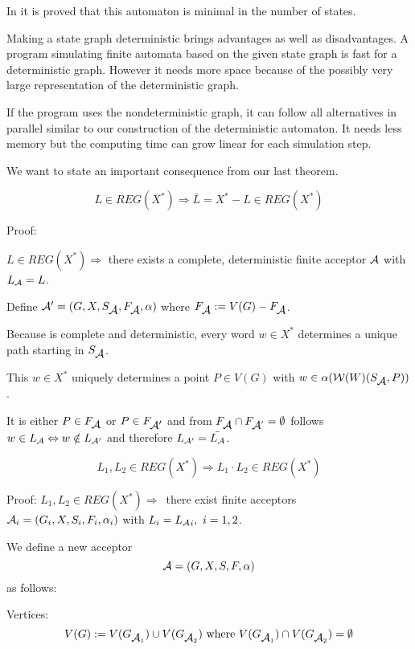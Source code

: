 In \cite{Co} it is proved that this automaton is minimal in the number of
states.

Making a state graph deterministic brings advantages as well as disadvantages. A
program simulating finite automata based on the given state graph is fast for
a deterministic graph. However it needs more space because of the possibly very
large representation of the deterministic graph.

If the program uses the nondeterministic graph, it can follow all alternatives
in parallel similar to our construction of the deterministic automaton. It needs
less memory but the computing time can grow linear for each simulation step.

We want to state an important consequence from our last theorem.

\begin{theorem}
\[ L \in REG(X^*) \Rightarrow \bar{L} = X^* - L \in REG(X^*) \]
\end{theorem}

Proof: 

$L \in REG(X^*) \Rightarrow $ there exists a complete, deterministic
finite acceptor $\mbox{$\mathcal{A}$}$ with $\mbox{$L_{\mathcal{A}}$} = L$.

Define $\mbox{$\mathcal{A'}$} = (G, X, S_{\mbox{$\mathcal{A}$}}, F_{\mbox{$\mathcal{A}$}}, \alpha)$ where $F_{\mbox{$\mathcal{A}$}} :=
V(G) - F_{\mbox{$\mathcal{A}$}}$.

Because  is complete and deterministic, every word $w \in X^*$ determines
a unique path starting in $S_{\mbox{$\mathcal{A}$}}$.

This $w \in X^*$ uniquely determines a point $P \in V(G)$ with $w \in
\alpha(\mbox{$\mathcal{W}(W)$}(S_{\mbox{$\mathcal{A}$}}, P))$.

It is either $P \in F_{\mbox{$\mathcal{A}$}}$ or $P \in F_{\mbox{$\mathcal{A'}$}}$ and from $F_{\mbox{$\mathcal{A}$}}
\cap F_{\mbox{$\mathcal{A}$}'} = \emptyset$ follows $w \in \mbox{$L_{\mathcal{A}}$} \Leftrightarrow w
\notin \mbox{$L_{\mathcal{A'}}$}$ and therefore $\mbox{$L_{\mathcal{A'}}$} = \bar{\mbox{$L_{\mathcal{A}}$}}$.

\begin{theorem}
\[ L_1, L_2 \in REG(X^*) \Rightarrow L_1 \cdot L_2 \in REG(X^*) \]
\end{theorem}

Proof: $L_1, L_2 \in REG(X^*) \Rightarrow$\ there exist finite acceptors
$\mbox{$\mathcal{A}$}_i = (G_i, X, S_i, F_i, \alpha_i)$ with $L_i = \mbox{$L_{\mathcal{A}}$}_i,\ i = 1,2$.

We define a new acceptor
\[\mbox{$\mathcal{A}$} = (G, X, S, F, \alpha) \]
as follows:

Vertices:
\[ V(G) := V(G_{\mbox{$\mathcal{A}$}_1}) \cup V(G_{\mbox{$\mathcal{A}$}_2})\mbox{ where }V(G_{\mbox{$\mathcal{A}$}_1})
\cap V(G_{\mbox{$\mathcal{A}$}_2}) = \emptyset \]

